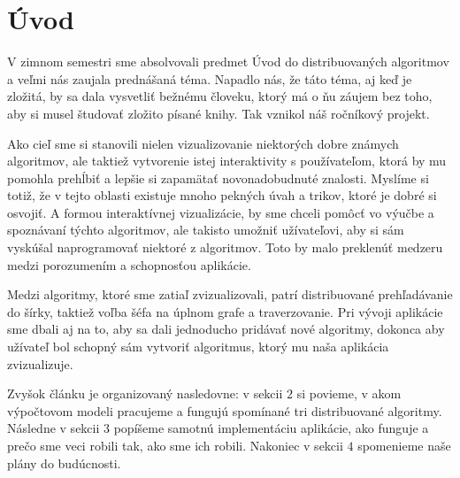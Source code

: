 \section{Úvod}

V zimnom semestri sme absolvovali predmet Úvod do distribuovaných algoritmov a veľmi nás zaujala
prednášaná téma. Napadlo nás, že táto téma, aj keď je zložitá, by sa dala vysvetliť bežnému človeku,
ktorý má o ňu záujem bez toho, aby si musel študovať zložito písané knihy. Tak vznikol náš ročníkový
projekt.

Ako cieľ sme si stanovili nielen vizualizovanie niektorých dobre známych algoritmov, ale taktiež
vytvorenie istej interaktivity s používateľom, ktorá by mu pomohla prehĺbiť a lepšie si zapamätať
novonadobudnuté znalosti. Myslíme si totiž, že v tejto oblasti existuje mnoho pekných úvah a trikov,
ktoré je dobré si osvojiť. A formou interaktívnej vizualizácie, by sme chceli pomôcť vo
výučbe a spoznávaní týchto algoritmov, ale takisto umožniť užívateľovi, aby si sám vyskúšal
naprogramovať niektoré z algoritmov. Toto by malo preklenúť medzeru medzi porozumením a schopnosťou
aplikácie.

Medzi algoritmy, ktoré sme zatiaľ zvizualizovali, patrí distribuované prehľadávanie do šírky,
taktiež voľba šéfa na úplnom grafe a traverzovanie. Pri vývoji aplikácie sme dbali aj na to, aby sa dali jednoducho
pridávať nové algoritmy, dokonca aby užívateľ bol schopný sám vytvoriť algoritmus, 
ktorý mu naša aplikácia zvizualizuje.

Zvyšok článku je organizovaný nasledovne: v sekcii $2$ si povieme, v akom výpočtovom modeli
pracujeme a fungujú spomínané tri distribuované algoritmy. 
Následne v sekcii $3$ popíšeme samotnú implementáciu aplikácie, ako
funguje a prečo sme veci robili tak, ako sme ich robili. Nakoniec v sekcii $4$ spomenieme naše plány do budúcnosti.
